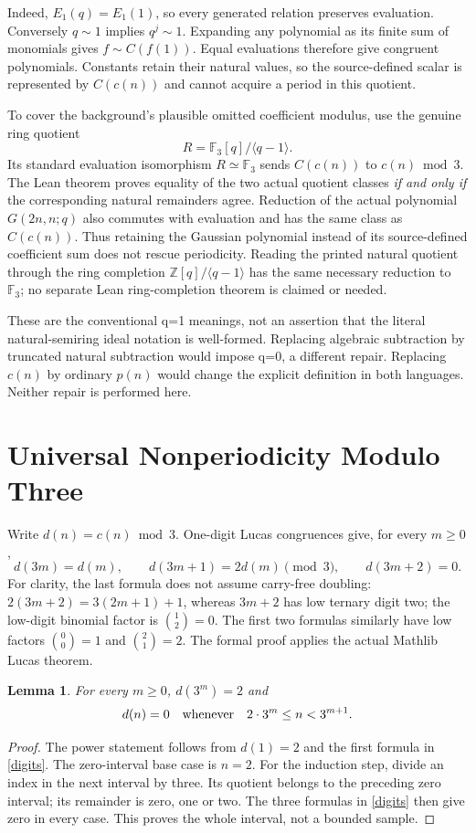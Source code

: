 \documentclass[11pt]{article}
\newtheorem{lemma}{Lemma}
\newcommand{\F}{\mathbb F}
\begin{document}
Indeed, $E_1(q)=E_1(1)$, so every generated relation preserves evaluation.
Conversely $q\sim1$ implies $q^j\sim1$. Expanding any polynomial as its
finite sum of monomials gives $f\sim C(f(1))$. Equal evaluations therefore
give congruent polynomials. Constants retain their natural values, so the
source-defined scalar is represented by $C(c(n))$ and cannot acquire a
period in this quotient.

To cover the background's plausible omitted coefficient modulus, use the
genuine ring quotient
\[
 R=\F_3[q]/\langle q-1\rangle.
\]
Its standard evaluation isomorphism $R\simeq\F_3$ sends $C(c(n))$ to
$c(n)\bmod3$. The Lean theorem proves equality of the two actual quotient
classes \emph{if and only if} the corresponding natural remainders agree.
Reduction of the actual polynomial $G(2n,n;q)$ also commutes with evaluation
and has the same class as $C(c(n))$. Thus retaining the Gaussian polynomial
instead of its source-defined coefficient sum does not rescue periodicity.
Reading the printed natural quotient through the ring completion
$\mathbb Z[q]/\langle q-1\rangle$ has the same necessary reduction to
$\F_3$; no separate Lean ring-completion theorem is claimed or needed.

These are the conventional q=1 meanings, not an assertion that the literal
natural-semiring ideal notation is well-formed. Replacing algebraic
subtraction by truncated natural subtraction would impose q=0, a different
repair. Replacing $c(n)$ by ordinary $p(n)$ would change the explicit
definition in both languages. Neither repair is performed here.

\section{Universal Nonperiodicity Modulo Three}
Write $d(n)=c(n)\bmod3$. One-digit Lucas congruences give, for every $m\ge0$,
\begin{equation}\label{digits}
 d(3m)=d(m),\qquad d(3m+1)=2d(m)\pmod3,\qquad d(3m+2)=0.
\end{equation}
For clarity, the last formula does not assume carry-free doubling:
$2(3m+2)=3(2m+1)+1$, whereas $3m+2$ has low ternary digit two;
the low-digit binomial factor is $\binom12=0$.
The first two formulas similarly have low factors $\binom00=1$ and
$\binom21=2$. The formal proof applies the actual Mathlib Lucas theorem.

\begin{lemma}\label{blocks}
For every $m\ge0$, $d(3^m)=2$ and
\[
 d(n)=0\quad\hbox{whenever}\quad 2\cdot3^m\le n<3^{m+1}.
\]
\end{lemma}
\begin{proof}
The power statement follows from $d(1)=2$ and the first formula in
\eqref{digits}. The zero-interval base case is $n=2$.
For the induction step, divide an index in the next interval by three.
Its quotient belongs to the preceding zero interval; its remainder is
zero, one or two. The three formulas in \eqref{digits} then give zero
in every case. This proves the whole interval, not a bounded sample.
\end{proof}
\end{document}
